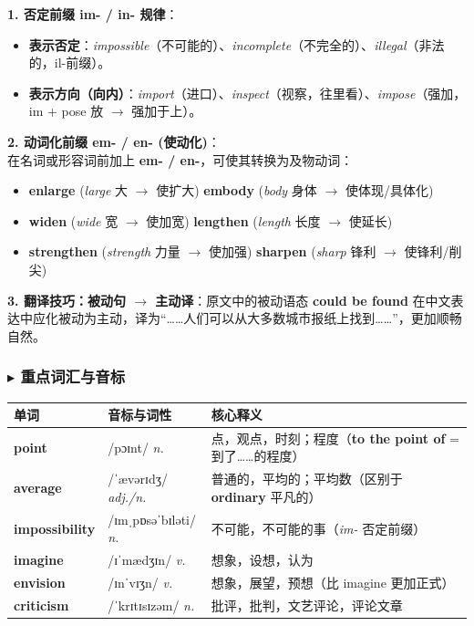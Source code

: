 \documentclass[cn,normal,11pt]{elegantnote}
\newcommand{\retrokey}[1]{{\color{accentcolor}\textbf{#1}}}
\renewcommand{\citshape}{\kaishu\fontspec{Arial}}
\begin{document}
\begin{proposition}[前缀衍生规律与被动译主动]
  \textbf{1. 否定前缀 im- / in- 规律}：
  \begin{itemize}
    \item \textbf{表示否定}：\textit{impossible}（不可能的）、\textit{incomplete}（不完全的）、\textit{illegal}（非法的，il-前缀）。
    \item \textbf{表示方向（向内）}：\textit{import}（进口）、\textit{inspect}（视察，往里看）、\textit{impose}（强加，im + pose 放 $\rightarrow$ 强加于上）。
  \end{itemize}
  \textbf{2. 动词化前缀 em- / en- (使动化)}：\\
  在名词或形容词前加上 \textbf{em- / en-}，可使其转换为及物动词：
  \begin{itemize}
    \item \textbf{enlarge} (\textit{large} 大 $\rightarrow$ 使扩大) \quad \textbf{embody} (\textit{body} 身体 $\rightarrow$ 使体现/具体化)
    \item \textbf{widen} (\textit{wide} 宽 $\rightarrow$ 使加宽) \quad \textbf{lengthen} (\textit{length} 长度 $\rightarrow$ 使延长)
    \item \textbf{strengthen} (\textit{strength} 力量 $\rightarrow$ 使加强) \quad \textbf{sharpen} (\textit{sharp} 锋利 $\rightarrow$ 使锋利/削尖)
  \end{itemize}
  \textbf{3. 翻译技巧：被动句 $\rightarrow$ 主动译}：原文中的被动语态 \textbf{could be found} 在中文表达中应化被动为主动，译为“……人们可以从大多数城市报纸上找到……”，更加顺畅自然。
\end{proposition}

\subsubsection*{$\blacktriangleright$ 重点词汇与音标}
\noindent
\begin{tabularx}{\textwidth}{l X p{7cm}}
  \toprule
  \textbf{单词} & \textbf{音标与词性} & \textbf{核心释义} \\
  \midrule
  \retrokey{point} & {\citshape /pɔɪnt/} \textit{n.} & 点，观点，时刻；程度（\textbf{to the point of} = 到了……的程度） \\
  \midrule
  \retrokey{average} & {\citshape /ˈævərɪdʒ/} \textit{adj./n.} & 普通的，平均的；平均数（区别于 \textbf{ordinary} 平凡的） \\
  \midrule
  \retrokey{impossibility} & {\citshape /ɪmˌpɒsəˈbɪləti/} \textit{n.} & 不可能，不可能的事（\textit{im-} 否定前缀） \\
  \midrule
  \retrokey{imagine} & {\citshape /ɪˈmædʒɪn/} \textit{v.} & 想象，设想，认为 \\
  \midrule
  \retrokey{envision} & {\citshape /ɪnˈvɪʒn/} \textit{v.} & 想象，展望，预想（比 imagine 更加正式） \\
  \midrule
  \retrokey{criticism} & {\citshape /ˈkrɪtɪsɪzəm/} \textit{n.} & 批评，批判，文艺评论，评论文章 \\
  \bottomrule
\end{tabularx}
\end{document}
